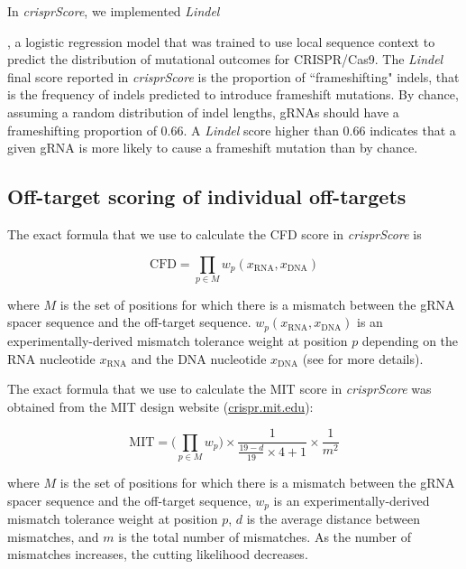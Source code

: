 \documentclass[pdftex,english,10pt]{article}
\begin{document}
In \textit{crisprScore}, we implemented \textit{Lindel} {\citep{lindel}, a logistic regression model that was trained to use local sequence context to predict the distribution of mutational outcomes for CRISPR/Cas9. The \textit{Lindel} final score reported in \textit{crisprScore} is the proportion of ``frameshifting" indels, that is the frequency of indels predicted to introduce frameshift mutations. By chance, assuming a random distribution of indel lengths, gRNAs should have a frameshifting proportion of 0.66. A \textit{Lindel} score higher than 0.66 indicates that a given gRNA is more likely to cause a frameshift mutation than by chance. 


\subsection*{Off-target scoring of individual off-targets}

The exact formula that we use to calculate the CFD score in \textit{crisprScore} is

\begin{equation*}
\text{CFD} = \prod_{p \in M}{w_p}(x_{\text{RNA}},x_\text{DNA})
\end{equation*}

where $M$ is the set of positions for which there is a mismatch between the gRNA spacer sequence and the off-target sequence.
$w_p(x_{\text{RNA}},x_\text{DNA})$ is an experimentally-derived mismatch tolerance weight at position $p$ depending on the RNA nucleotide $x_{\text{RNA}}$ and the DNA nucleotide $x_{\text{DNA}}$ (see \citet{doench2016optimized} for more details).


The exact formula that we use to calculate the MIT score in \textit{crisprScore} was obtained from the MIT design website (\url{crispr.mit.edu}):



\begin{equation*}
\text{MIT} = \biggl(\prod_{p \in M}{w_p}\biggr)\times\frac{1}{\frac{19-d}{19}\times4+1}\times\frac{1}{m^2}
\end{equation*}

where $M$ is the set of positions for which there is a mismatch between the gRNA spacer sequence and the off-target sequence, $w_p$ is an experimentally-derived mismatch tolerance weight at position $p$, $d$ is the average distance between mismatches, and $m$ is the total number of mismatches. As the number of mismatches increases, the cutting likelihood decreases. 

}
\end{document}
